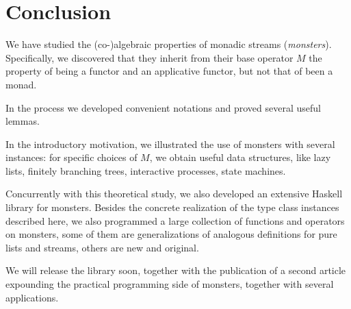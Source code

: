 \section{Conclusion}

We have studied the (co-)algebraic properties of monadic streams ({\em monsters}).
Specifically, we discovered that they inherit from their base operator $M$ the property of being a functor and an applicative functor, but not that of been a monad.

In the process we developed convenient notations and proved several useful lemmas.

In the introductory motivation, we illustrated the use of monsters with several instances: for specific choices of $M$, we obtain useful data structures, like lazy lists, finitely branching trees, interactive processes, state machines.

Concurrently with this theoretical study, we also developed an extensive Haskell library for monsters.
Besides the concrete realization of the type class instances described here, we also programmed a large collection of functions and operators on monsters, some of them are generalizations of analogous definitions for pure lists and streams, others are new and original.

We will release the library soon, together with the publication of a second article expounding the practical programming side of monsters, together with several applications.
